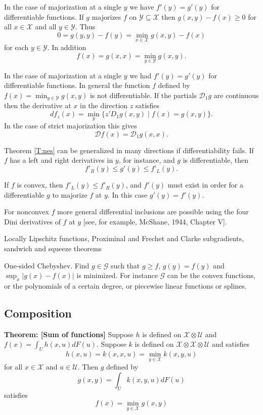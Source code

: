 \documentclass[
  12pt,
]{book}
\begin{document}
In the case of majorization at a single \(y\) we have \(f'(y)=g'(y)\) for differentiable functions. If \(g\) majorizes \(f\) on \(\mathcal{Y}\subseteq\mathcal{X}\)
then \(g(x,y)-f(x)\geq 0\) for all \(x\in\mathcal{X}\)
and all \(y\in\mathcal{Y}\). Thus
\[
0=g(y,y)-f(y)=\min_{x\in\mathcal{X}}g(x,y)-f(x)
\]
for each \(y\in\mathcal{Y}\). In addition
\[
f(x)=g(x,x)=\min_{y\in\mathcal{Y}}g(x,y).
\]

In the case of majorization at a single \(y\) we had \(f'(y)=g'(y)\) for differentiable functions. In general
the function \(f\) defined by \(f(x)=\min_{y\in\mathcal{Y}} g(x,y)\) is not differentiable. If the partials \(\mathcal{D}_1g\) are continuous then the derivative at \(x\) in the direction \(z\) satisfies
\[
df_z(x)=\min_y\{z'D_1g(x,y)\mid f(x)=g(x,y)\}.
\]
In the case of strict majorization this gives
\[
\mathcal{D}f(x)=\mathcal{D}_1g(x,x).
\]

Theorem \ref{T:nes} can be generalized in many directions if differentiability fails.
If \(f\) has a left and right derivatives in \(y\), for instance, and \(g\) is differentiable, then
\[
f'_R(y)\leq g'(y)\leq f'_L(y).
\]

If \(f\) is convex, then \(f'_L(y) \leq f'_R(y)\), and \(f'(y)\) must exist in order for a differentiable \(g\) to majorize \(f\) at \(y\). In this case \(g'(y)=f'(y)\).

For nonconvex \(f\) more general differential inclusions are possible using the four Dini derivatives of \(f\) at \(y\) {[}see, for example, McShane, 1944, Chapter V{]}.

Locally Lipschitz functions, Proximinal and Frechet and Clarke subgradients, sandwich and squeeze theorems

One-sided Chebyshev. Find \(g\in\mathcal{G}\) such that \(g\geq f\),
\(g(y)=f(y)\) and \(\sup_x|g(x)-f(x)|\) is minimized.
For instance \(\mathcal{G}\) can be the convex functions, or the polynomials of a certain degree,
or piecewise linear functions or splines.

\hypertarget{composition}{%
\subsection{Composition}\label{composition}}

\textbf{Theorem: {[}Sum of functions{]}}
Suppose \(h\) is defined on \(\mathcal{X}\otimes\mathcal{U}\) and \(f(x)=\int_U h(x,u)dF(u)\). Suppose \(k\) is defined on \(\mathcal{X}\otimes\mathcal{X}\otimes\mathcal{U}\) and satisfies
\[
h(x,u)=k(x,x,u)=\min_{y\in\mathcal{X}} k(x,y,u)
\]
for all \(x\in\mathcal{X}\) and \(u\in\mathcal{U}\). Then \(g\) defined by
\[
g(x,y)=\int_U k(x,y,u)dF(u)
\]
satisfies
\[
f(x)=\min_{y\in\mathcal{X}} g(x,y)
\]
\end{document}
